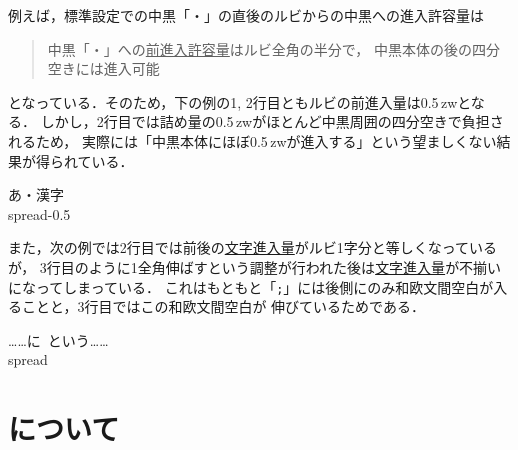 \documentclass[a4paper,10ptj]{ltjsarticle}
\begin{document}
例えば，標準設定での中黒「・」の直後のルビからの中黒への進入許容量は
\begin{quote}
  中黒「・」への\underline{前進入許容量}はルビ全角の半分で，
  中黒本体の後の四分空きには進入可能
\end{quote}
となっている．そのため，下の例の1, 2行目ともルビの前進入量は0.5\,zwとなる．
しかし，2行目では詰め量の0.5\,zwがほとんど中黒周囲の四分空きで負担されるため，
実際には「中黒本体にほぼ0.5\,zwが進入する」という望ましくない結果が得られている．
\begin{LTXexample}[preset=\Large,width=0.4\textwidth]
\leavevmode\hbox{あ・漢字}\\
\hbox spread-0.5
\end{LTXexample}

また，次の例では2行目では前後の\underline{文字進入量}がルビ1字分と等しくなっているが，
3行目のように1全角伸ばすという調整が行われた後は\underline{文字進入量}が不揃いになってしまっている．
これはもともと「\texttt{;}」には後側にのみ和欧文間空白が入ることと，3行目ではこの和欧文間空白が
伸びているためである．
\begin{LTXexample}[preset=\Large,width=0.4\textwidth]
\leavevmode\hbox{……に%
  という……}\\
\hbox spread
\end{LTXexample}

\newpage
\section{について}
\end{document}
